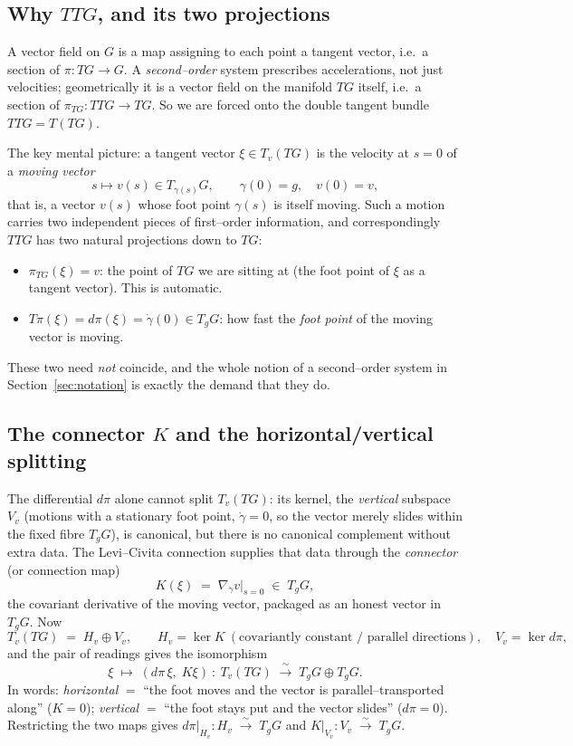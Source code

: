 \documentclass[11pt]{article}
\theoremstyle{definition}
\theoremstyle{plain}
\newcommand{\dpi}{d\pi}
\newcommand{\TG}{TG}
\newcommand{\TTG}{TTG}
\newcommand{\iso}{\;\xrightarrow{\;\sim\;}\;}
\begin{document}
\subsection{Why $\TTG$, and its two projections}\label{ss:twoproj}

A vector field on $G$ is a map assigning to each point a tangent vector, i.e.\ a section of
$\pi:\TG\to G$. A \emph{second--order} system prescribes accelerations, not just
velocities; geometrically it is a vector field on the manifold $\TG$ itself, i.e.\ a
section of $\pi_{\TG}:\TTG\to \TG$. So we are forced onto the double tangent bundle
$\TTG=T(\TG)$.

The key mental picture: a tangent vector $\xi\in T_{v}(\TG)$ is the velocity at $s=0$ of a
\emph{moving vector}
\[
  s\longmapsto v(s)\in T_{\gamma(s)}G,
  \qquad \gamma(0)=g,\quad v(0)=v ,
\]
that is, a vector $v(s)$ whose foot point $\gamma(s)$ is itself moving. Such a motion
carries two independent pieces of first--order information, and correspondingly $\TTG$ has
two natural projections down to $\TG$:
\begin{itemize}[leftmargin=2em]
  \item $\pi_{\TG}(\xi)=v$: the point of $\TG$ we are sitting at (the foot point of $\xi$
        as a tangent vector). This is automatic.
  \item $T\pi(\xi)=\dpi(\xi)=\dot\gamma(0)\in T_{g}G$: how fast the \emph{foot point} of
        the moving vector is moving.
\end{itemize}
These two need \emph{not} coincide, and the whole notion of a second--order system in
Section~\ref{sec:notation} is exactly the demand that they do.

\subsection{The connector $K$ and the horizontal/vertical splitting}\label{ss:split}

The differential $\dpi$ alone cannot split $T_{v}(\TG)$: its kernel, the \emph{vertical}
subspace $V_{v}$ (motions with a stationary foot point, $\dot\gamma=0$, so the vector
merely slides within the fixed fibre $T_{g}G$), is canonical, but there is no canonical
complement without extra data. The Levi--Civita connection supplies that data through the
\emph{connector} (or connection map)
\[
  K(\xi)\;=\;\nabla_{\dot\gamma}v\big|_{s=0}\;\in\;T_{g}G,
\]
the covariant derivative of the moving vector, packaged as an honest vector in $T_{g}G$.
Now
\[
  T_{v}(\TG)\;=\;H_{v}\oplus V_{v},
  \qquad
  H_{v}=\ker K \ (\text{covariantly constant / parallel directions}),\quad
  V_{v}=\ker \dpi ,
\]
and the pair of readings gives the isomorphism
\[
  \xi\;\longmapsto\;(\dpi\,\xi,\;K\xi)
  \ :\ T_{v}(\TG)\iso T_{g}G\oplus T_{g}G .
\]
In words: \emph{horizontal} $=$ ``the foot moves and the vector is parallel--transported
along'' ($K=0$); \emph{vertical} $=$ ``the foot stays put and the vector slides''
($\dpi=0$). Restricting the two maps gives $\dpi|_{H_{v}}:H_{v}\iso T_{g}G$ and
$K|_{V_{v}}:V_{v}\iso T_{g}G$.
\end{document}
